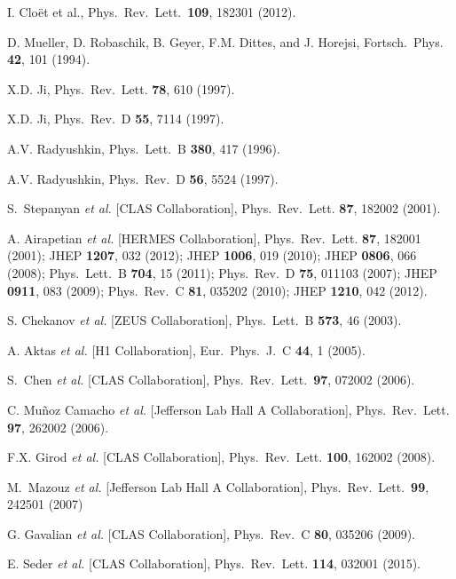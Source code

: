 \documentclass[twocolumn,nofootinbib,showpacs,prl,superscriptaddress,secnumarabic,amssymb,nobibnotes,aps,floatfix]{revtex4}
\begin{document}
\begin{thebibliography}{99}
I. Clo\"et et al., %
Phys.\ Rev.\ Lett.\ {\bf 109}, 182301 (2012).


 D. Mueller, D. Robaschik, B. Geyer, F.M. Dittes, and 
   J.  Horejsi,
Fortsch.\ Phys. {\bf 42}, 101 (1994).
  
X.D. Ji,
Phys.\ Rev.\ Lett. {\bf 78}, 610 (1997).

X.D. Ji,
Phys.\ Rev.\ D {\bf 55}, 7114 (1997).

A.V. Radyushkin,
Phys.\ Lett.\  B {\bf 380}, 417 (1996).

A.V. Radyushkin,
Phys.\ Rev.\ D {\bf 56}, 5524 (1997).

S.~Stepanyan {\it et al.} [CLAS Collaboration],
Phys.\ Rev.\ Lett. {\bf 87}, 182002 (2001).

A. Airapetian {\it et al.} [HERMES Collaboration],
Phys.\ Rev.\ Lett. {\bf 87}, 182001 (2001);
JHEP {\bf 1207}, 032 (2012);
JHEP {\bf 1006}, 019 (2010);
JHEP {\bf 0806}, 066 (2008);
Phys.\ Lett.\ B {\bf 704}, 15 (2011);
Phys.\ Rev.\  D {\bf 75}, 011103 (2007);
JHEP {\bf 0911}, 083 (2009);
Phys.\ Rev.\ C {\bf 81}, 035202 (2010);
JHEP {\bf 1210}, 042 (2012).

S. Chekanov {\it et al.} [ZEUS Collaboration],
Phys.\ Lett.\  B {\bf 573}, 46 (2003).

A. Aktas {\it et al.} [H1 Collaboration],
Eur.\ Phys.\ J.\ C {\bf 44}, 1 (2005).

S.~Chen {\it et al.} [CLAS Collaboration],
Phys.\ Rev.\ Lett.\ {\bf 97}, 072002 (2006).

C. Mu\~noz Camacho {\it et al.} [Jefferson Lab Hall A Collaboration],
Phys.\ Rev.\ Lett. {\bf 97}, 262002 (2006).

F.X. Girod {\it et al.} [CLAS Collaboration],
Phys.\ Rev.\ Lett. {\bf 100}, 162002 (2008).

   M.~Mazouz {\it et al.} [Jefferson Lab Hall A Collaboration],
   Phys.\ Rev.\ Lett.\  {\bf 99}, 242501 (2007)

G. Gavalian {\it et al.} [CLAS Collaboration],
Phys.\ Rev.\ C {\bf 80}, 035206 (2009).

E. Seder {\it et al.} [CLAS Collaboration],
Phys.\ Rev.\ Lett. {\bf 114}, 032001 (2015).


\end{thebibliography}
\end{document}
